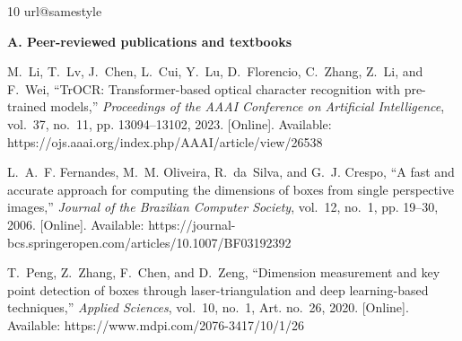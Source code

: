 %
%

\begin{thebibliography}{10}
\providecommand{\url}[1]{#1}
\csname url@samestyle\endcsname
\providecommand{\newblock}{\relax}
\providecommand{\bibinfo}[2]{#2}
\providecommand{\BIBentrySTDinterwordspacing}{\spaceskip=0pt\relax}
\providecommand{\BIBentryALTinterwordstretchfactor}{4}
\providecommand{\BIBentryALTinterwordspacing}{\spaceskip=\fontdimen2\font plus
\BIBentryALTinterwordstretchfactor\fontdimen3\font minus \fontdimen4\font\relax}
\providecommand{\bibgroup}[1]{\item[]\hspace{-\labelwidth}\hspace{-\labelsep}%
{\normalfont\bfseries #1}\vspace{2pt}}

\bibgroup{A. Peer-reviewed publications and textbooks}

M.~Li, T.~Lv, J.~Chen, L.~Cui, Y.~Lu, D.~Florencio, C.~Zhang, Z.~Li, and F.~Wei,
  ``{TrOCR}: Transformer-based optical character recognition with pre-trained
  models,'' \emph{Proceedings of the AAAI Conference on Artificial
  Intelligence}, vol.~37, no.~11, pp. 13094--13102, 2023. [Online]. Available:
  \url{https://ojs.aaai.org/index.php/AAAI/article/view/26538}

L.~A.~F. Fernandes, M.~M. Oliveira, R.~da~Silva, and G.~J. Crespo, ``A fast and
  accurate approach for computing the dimensions of boxes from single
  perspective images,'' \emph{Journal of the Brazilian Computer Society},
  vol.~12, no.~1, pp. 19--30, 2006. [Online]. Available:
  \url{https://journal-bcs.springeropen.com/articles/10.1007/BF03192392}

T.~Peng, Z.~Zhang, F.~Chen, and D.~Zeng, ``Dimension measurement and key point
  detection of boxes through laser-triangulation and deep learning-based
  techniques,'' \emph{Applied Sciences}, vol.~10, no.~1, Art. no.~26, 2020.
  [Online]. Available: \url{https://www.mdpi.com/2076-3417/10/1/26}


\end{thebibliography}
